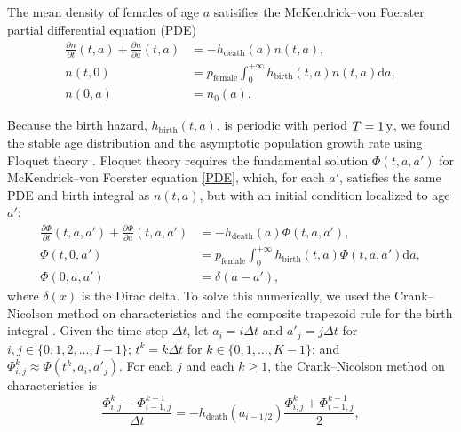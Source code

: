 \documentclass[12pt]{article}
\newcommand{\md}{\mathrm{d}}
\begin{document}
The mean density of females of age $a$ satisifies the McKendrick--von
Foerster partial differential equation (PDE)
\begin{equation}
  \label{PDE}
  \begin{split}
    \frac{\partial n}{\partial t}(t, a)
    + \frac{\partial n}{\partial a}(t, a)
    &= - h_{\text{death}}(a) n(t, a),
    \\
    n(t, 0) &=
    p_{\text{female}}
    \int_0^{+\infty} h_{\text{birth}}(t, a) n(t, a) \md a,
    \\
    n(0, a) &= n_0(a).
  \end{split}
\end{equation}

Because the birth hazard, $h_{\text{birth}}(t, a)$,
is periodic with period $T = \unit[1]{y}$,
we found the stable age distribution and the asymptotic population growth
rate using Floquet theory \autocite{parker_1992}.
Floquet theory requires the fundamental solution $\Phi(t, a, a')$ for
McKendrick--von Foerster equation \eqref{PDE}, which, for each $a'$,
satisfies the same PDE and birth integral as
$n(t, a)$, but with an initial condition localized to age $a'$:
\begin{equation}
  \label{fundamental_PDE}
  \begin{split}
    \frac{\partial \Phi}{\partial t}(t, a, a')
    + \frac{\partial \Phi}{\partial a}(t, a, a')
    &= - h_{\text{death}}(a) \Phi(t, a, a'),
    \\
    \Phi(t, 0, a') &=
    p_{\text{female}}
    \int_0^{+\infty} h_{\text{birth}}(t, a) \Phi(t, a, a') \md a,
    \\
    \Phi(0, a, a') &= \delta(a - a'),
  \end{split}
\end{equation}
where $\delta(x)$ is the Dirac delta.
To solve this numerically, we used the
Crank--Nicolson method on characteristics and the composite trapezoid
rule for the birth integral \autocite{milner_1992}.  Given the time
step $\Delta t$,
let $a_i = i \Delta t$
and $a'_j = j \Delta t$
for $i, j \in \{0, 1, 2, \ldots, I - 1\}$;
$t^k = k \Delta t$
for $k \in \{0, 1, \ldots, K - 1\}$;
and $\Phi_{i, j}^k \approx \Phi(t^k, a_i, a'_j)$.
For each $j$ and each $k \geq 1$, the Crank--Nicolson method on
characteristics is
\begin{equation}
  \label{CN_step}
  \frac{\Phi_{i, j}^k - \Phi_{i - 1, j}^{k - 1}}{\Delta t}
  = - h_{\text{death}}(a_{i - 1 / 2})
  \frac{\Phi_{i, j}^k + \Phi_{i - 1, j}^{k - 1}}{2},
\end{equation}
\end{document}
